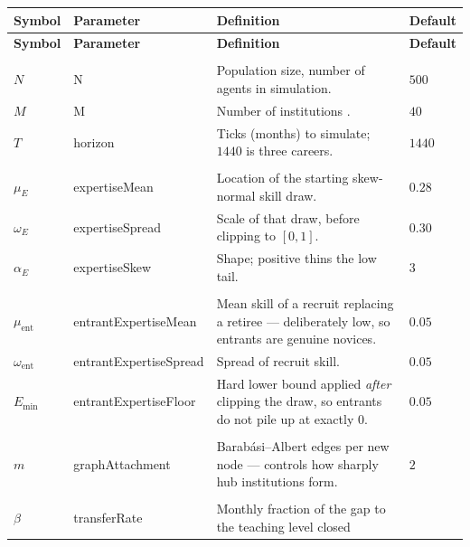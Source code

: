\documentclass[11pt]{article}
\begin{document}
\begingroup
\setlength{\tabcolsep}{3pt}
\noindent\footnotesize
\begin{longtable}{L{1.6cm} K{3.8cm} L{6.9cm} S{3.2cm}}
\toprule
\textbf{Symbol} & \textnormal{\textbf{Parameter}} & \textbf{Definition} &
\textbf{Default} \\
\midrule
\endfirsthead
\toprule
\textbf{Symbol} & \textnormal{\textbf{Parameter}} & \textbf{Definition} &
\textbf{Default} \\
\midrule
\endhead
\bottomrule
\endlastfoot
{}\\[2pt]
$N$ & N & Population size, number of agents in simulation.
  & $500$ \\
$M$ & M & Number of institutions .
  & $40$ \\
$T$ & horizon & Ticks (months) to simulate; $1440$ is three careers.
  & $1440$ \\
\addlinespace
{}\\[2pt]
$\mu_E$ & expertiseMean & Location of the starting skew-normal skill draw.
  & $0.28$ \\
$\omega_E$ & expertiseSpread & Scale of that draw, before clipping to $[0,1]$.
  & $0.30$ \\
$\alpha_E$ & expertiseSkew & Shape; positive thins the low tail.
  & $3$ \\
\addlinespace
{}\\[2pt]
$\mu_{\text{ent}}$ & entrantExpertiseMean & Mean skill of a recruit replacing a
  retiree --- deliberately low, so entrants are genuine novices.
  & $0.05$ \\
$\omega_{\text{ent}}$ & entrantExpertiseSpread & Spread of recruit skill.
  & $0.05$ \\
$E_{\min}$ & entrantExpertiseFloor & Hard lower bound applied \emph{after}
  clipping the draw, so entrants do not pile up at exactly $0$.
  & $0.05$ \\
\addlinespace
{}\\[2pt]
$m$ & graphAttachment & Barab\'asi--Albert edges per new node --- controls how
  sharply hub institutions form.
  & $2$ \\
\addlinespace
{}\\[2pt]
$\beta$ & transferRate & Monthly fraction of the gap to the teaching level closed

\end{longtable}
\end{document}
